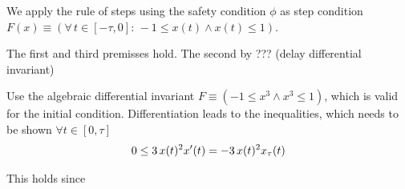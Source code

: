 \documentclass[10pt]{article}
\begin{document}
We apply the rule of steps using the safety condition $\phi$ as step condition $F(x)\equiv(\forall\,t\in[-\tau,0]:\,-1\leq x(t)\wedge x(t)\leq 1)$.

The first and third premisses hold. The second by ??? (delay differential invariant)

Use the algebraic differential invariant $F\equiv(-1\leq x^3\wedge x^3\leq1)$, which is valid for the initial condition. Differentiation leads to the inequalities, which needs to be shown $\forall t\in[0,\tau]$
\begin{equation}
    0\leq 3\,x(t)^2 x'(t) = -3\,x(t)^2 x_{\tau}(t)
\end{equation}

This holds since

\nocite{*}


\end{document}
